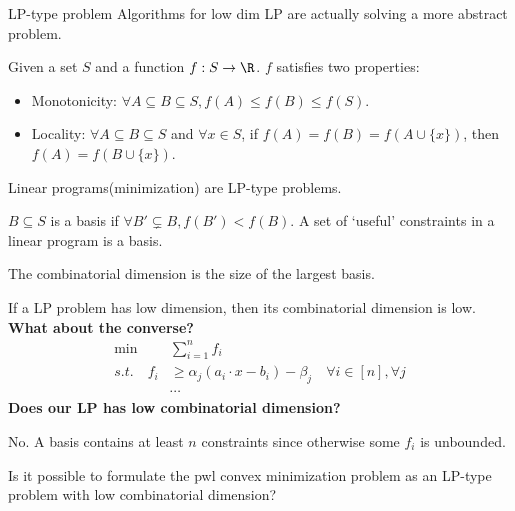 \documentclass{beamer}
\begin{document}
\begin{frame}[allowframebreaks]{LP-type problem}
    Algorithms for low dim LP are actually solving a more abstract problem.
    \begin{definition}
        Given a set $S$ and a function $f:S\to \R$. $f$ satisfies two properties:%
        \begin{itemize}
            \item Monotonicity: $\forall A\subseteq B\subseteq S, f(A)\leq f(B)\leq f(S)$.
            \item Locality: $\forall A\subseteq B\subseteq S$ and $\forall x\in S$, if $f(A) = f(B) = f(A \cup \{x\})$, then $f(A) = f(B \cup \{x\})$.
        \end{itemize}
    \end{definition}
    Linear programs(minimization) are LP-type problems.

    $B\subseteq S$ is a basis if $\forall B'\subsetneq B, f(B')<f(B)$. A set of `useful' constraints in a linear program is a basis.

    The combinatorial dimension is the size of the largest basis.

    If a LP problem has low dimension, then its combinatorial dimension is low. \textbf{What about the converse?}
    \newpage
    \begin{align*}
        \min &\sum_{i=1}^n f_i\\
        s.t. \quad f_i&\geq \alpha_j(a_i\cdot x -b_i)-\beta_j \quad \forall i\in[n], \forall j\\
        &\cdots
    \end{align*}%
    \textbf{Does our LP has low combinatorial dimension?}
    
    No. A basis contains at least $n$ constraints since otherwise some $f_i$ is unbounded.

    \begin{problem}
        Is it possible to formulate the pwl convex minimization problem as an LP-type problem with low combinatorial dimension?
    \end{problem}
\end{frame}
\end{document}
